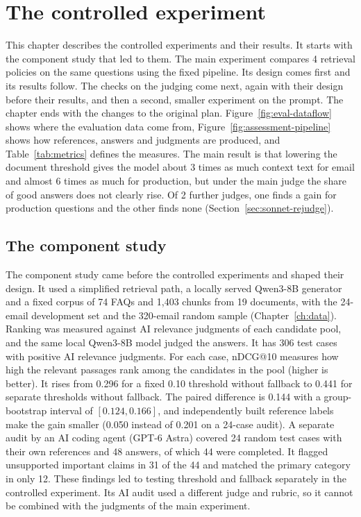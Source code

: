 \section{The controlled experiment}
\label{ch:methodology}

This chapter describes the controlled experiments and their results. It starts with the component study that led to them. The main experiment compares 4 retrieval policies on the same questions using the fixed pipeline. Its design comes first and its results follow. The checks on the judging come next, again with their design before their results, and then a second, smaller experiment on the prompt. The chapter ends with the changes to the original plan. Figure~\ref{fig:eval-dataflow} shows where the evaluation data come from, Figure~\ref{fig:assessment-pipeline} shows how references, answers and judgments are produced, and Table~\ref{tab:metrics} defines the measures. The main result is that lowering the document threshold gives the model about 3 times as much context text for email and almost 6 times as much for production, but under the main judge the share of good answers does not clearly rise. Of 2 further judges, one finds a gain for production questions and the other finds none (Section~\ref{sec:sonnet-rejudge}).



\subsection{The component study}
\label{sec:component-study}

The component study came before the controlled experiments and shaped their design. It used a simplified retrieval path, a locally served Qwen3-8B generator and a fixed corpus of 74 FAQs and 1,403 chunks from 19 documents, with the 24-email development set and the 320-email random sample (Chapter~\ref{ch:data}). Ranking was measured against AI relevance judgments of each candidate pool, and the same local Qwen3-8B model judged the answers. It has 306 test cases with positive AI relevance judgments. For each case, nDCG@10 measures how high the relevant passages rank among the candidates in the pool (higher is better). It rises from 0.296 for a fixed 0.10 threshold without fallback to 0.441 for separate thresholds without fallback. The paired difference is 0.144 with a group-bootstrap interval of $[0.124,0.166]$, and independently built reference labels make the gain smaller (0.050 instead of 0.201 on a 24-case audit). A separate audit by an AI coding agent (GPT-6 Astra) covered 24 random test cases with their own references and 48 answers, of which 44 were completed. It flagged unsupported important claims in 31 of the 44 and matched the primary category in only 12. These findings led to testing threshold and fallback separately in the controlled experiment. Its AI audit used a different judge and rubric, so it cannot be combined with the judgments of the main experiment.

